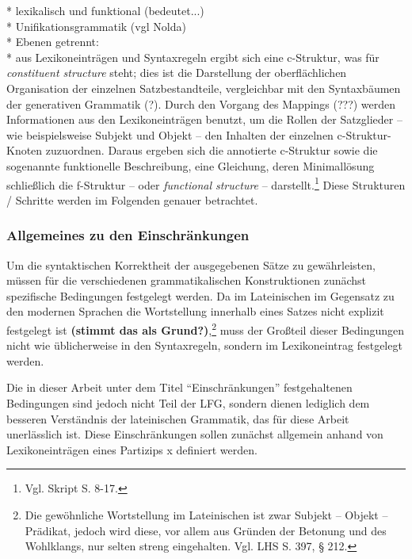 \documentclass[12pt,a4paper]{article}
\begin{document}
* lexikalisch und funktional (bedeutet...) \\
* Unifikationsgrammatik (vgl Nolda) \\
* Ebenen getrennt: \\
* aus Lexikoneinträgen und Syntaxregeln ergibt sich eine c-Struktur, was für \textit{constituent structure} steht; dies ist die Darstellung der oberflächlichen Organisation der einzelnen Satzbestandteile, vergleichbar mit den Syntaxbäumen der generativen Grammatik (?). Durch den Vorgang des Mappings (???) werden Informationen aus den Lexikoneinträgen benutzt, um die Rollen der Satzglieder -- wie beispielsweise Subjekt und Objekt -- den Inhalten der einzelnen c-Struktur-Knoten zuzuordnen. Daraus ergeben sich die annotierte c-Struktur sowie die sogenannte funktionelle Beschreibung, eine Gleichung, deren Minimallösung schließlich die f-Struktur -- oder \textit{functional structure} -- darstellt.\footnote{Vgl. Skript S. 8-17.} Diese Strukturen / Schritte werden im Folgenden genauer betrachtet.

\subsubsection{Allgemeines zu den Einschränkungen}
Um die syntaktischen Korrektheit der ausgegebenen Sätze zu gewährleisten, müssen für die verschiedenen grammatikalischen Konstruktionen zunächst spezifische Bedingungen festgelegt werden.
Da im Lateinischen im Gegensatz zu den modernen Sprachen die Wortstellung innerhalb eines Satzes nicht explizit festgelegt ist \textbf{(stimmt das als Grund?)},\footnote{Die gewöhnliche Wortstellung im Lateinischen ist zwar Subjekt – Objekt – Prädikat, jedoch wird diese, vor allem aus Gründen der Betonung und des Wohlklangs, nur selten streng eingehalten. Vgl. LHS S. 397, § 212.} muss der Großteil dieser Bedingungen nicht wie üblicherweise in den Syntaxregeln, sondern im Lexikoneintrag festgelegt werden.

Die in dieser Arbeit unter dem Titel ``Einschränkungen'' festgehaltenen Bedingungen sind jedoch nicht Teil der LFG, sondern dienen lediglich dem besseren Verständnis der lateinischen Grammatik, das für diese Arbeit unerlässlich ist. Diese Einschränkungen sollen zunächst allgemein anhand von Lexikoneinträgen eines Partizips x definiert werden. 
\end{document}
